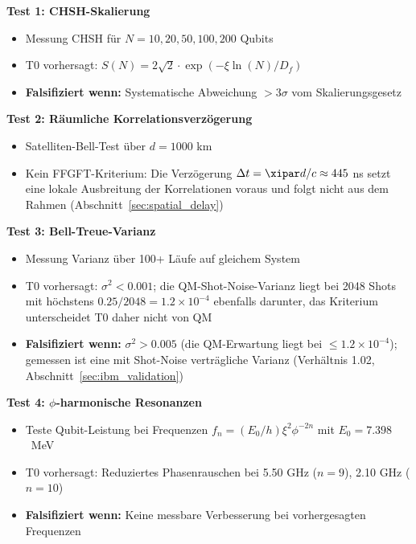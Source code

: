 \begin{experimentbox}
	\textbf{Test 1: CHSH-Skalierung}
	\begin{itemize}
		\item Messung CHSH für $N = 10, 20, 50, 100, 200$ Qubits
		\item T0 vorhersagt: $S(N) = 2\sqrt{2} \cdot \exp(-\xi \ln(N)/D_f)$
		\item \textbf{Falsifiziert wenn:} Systematische Abweichung $> 3\sigma$ vom Skalierungsgesetz
	\end{itemize}
	
	\textbf{Test 2: Räumliche Korrelationsverzögerung}
	\begin{itemize}
		\item Satelliten-Bell-Test über $d = 1000$ km
		\item Kein FFGFT-Kriterium: Die Verzögerung $\Delta t = \xipar d/c \approx 445$ ns setzt eine lokale Ausbreitung der Korrelationen voraus und folgt nicht aus dem Rahmen (Abschnitt~\ref{sec:spatial_delay})
	\end{itemize}

	
	\textbf{Test 3: Bell-Treue-Varianz}
	\begin{itemize}
		\item Messung Varianz über 100+ Läufe auf gleichem System
		\item T0 vorhersagt: $\sigma^2 < 0.001$; die QM-Shot-Noise-Varianz liegt bei 2048 Shots mit höchstens $0.25/2048 = 1.2 \times 10^{-4}$ ebenfalls darunter, das Kriterium unterscheidet T0 daher nicht von QM
		\item \textbf{Falsifiziert wenn:} $\sigma^2 > 0.005$ (die QM-Erwartung liegt bei $\leq 1.2 \times 10^{-4}$); gemessen ist eine mit Shot-Noise verträgliche Varianz (Verhältnis 1.02, Abschnitt~\ref{sec:ibm_validation})
	\end{itemize}
	
	\textbf{Test 4: $\phi$-harmonische Resonanzen}
	\begin{itemize}
		\item Teste Qubit-Leistung bei Frequenzen $f_n = (E_0/h) \xi^2 \phi^{-2n}$ mit $E_0 = 7.398$~MeV
		\item T0 vorhersagt: Reduziertes Phasenrauschen bei 5.50 GHz ($n = 9$), 2.10 GHz ($n = 10$)
		\item \textbf{Falsifiziert wenn:} Keine messbare Verbesserung bei vorhergesagten Frequenzen
	\end{itemize}
\end{experimentbox}

